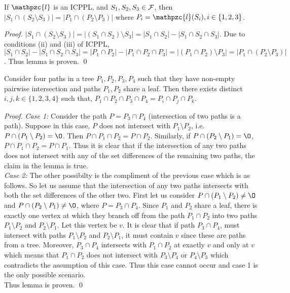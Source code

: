 \documentclass{llncs}
\def\cF{{\cal F}}
\def\cl{\mathpzc{l}}
\begin{document}
\begin{lemma}
  \label{lem:setminuscard}
  If $\cl$ is an ICPPL, and $S_1, S_2, S_3 \in
  \cF$, then $|S_1 \cap (S_2 \setminus S_3)| = |P_1 \cap (P_2
   \setminus P_3)|$ where $P_i = \cl(S_i), i \in \{1, 2, 3\}$.
\end{lemma}
\begin{proof}
  $|S_1 \cap (S_2 \setminus S_3)| = |(S_1 \cap S_2) \setminus S_3| =
  |S_1 \cap S_2| - |S_1 \cap S_2 \cap S_3|$. Due to conditions (ii)
  and (iii) of ICPPL, $|S_1 \cap S_2| - |S_1 \cap S_2 \cap S_3| = |P_1
  \cap P_2| - |P_1 \cap P_2 \cap P_3| = |(P_1 \cap P_2) \setminus P_3|
  = |P_1 \cap (P_2 \setminus P_3)|$. Thus lemma is proven. \qed
\end{proof}

\begin{lemma}
  \label{lem:fourpaths} Consider four paths in a tree $P_1, P_2, P_3,
  P_4$ such that they have non-empty pairwise intersection and paths $P_1,
  P_2$ share a leaf. Then there exists distinct $i, j, k \in
  \{1,2,3,4\}$ such that, $P_1 \cap P_2 \cap P_3 \cap P_4 = P_i \cap
  P_j \cap P_k$.
\end{lemma}
\begin{proof}
  {\em Case 1:} Consider the path $P = P_3 \cap P_4$ (intersection of two paths is a path).
  Suppose in this case, $P$ does not intersect with $P_1 \setminus
  P_2$, i.e. $P \cap (P_1 \setminus P_2) = \O$. Then $P \cap P_1 \cap
  P_2 = P \cap P_2$. Similarly, if $P \cap (P_2 \setminus P_1) = \O$,
  $P \cap P_1 \cap P_2 = P \cap P_1$. Thus it is clear that if the
  intersection of any two paths does not intersect with any of the set
  differences of
  the remaining two paths, the claim in the lemma is true.\\
  {\em Case 2:} The other possibilty is the compliment of the previous
  case which is as follows. So let us assume that the intersection of
  any two paths intersects with both the set differences of the other
  two. First let us consider $P \cap (P_1 \setminus P_2) \ne \O$ and
  $P \cap (P_2 \setminus P_1) \ne \O$, where $P = P_3 \cap P_4$. Since
  $P_1$ and $P_2$ share a leaf, there is exactly one vertex at which
  they branch off from the path $P_1 \cap P_2$ into two paths $P_1
  \setminus P_2$ and $P_2 \setminus P_1$. Let this vertex be $v$. It
  is clear that if path $P_3 \cap P_4$, must intersect with paths $P_1
  \setminus P_2$ and $P_2 \setminus P_1$, it must contain $v$ since
  these are paths from a tree. Moreover, $P_3 \cap P_4$ intersects
  with $P_1 \cap P_2$ at exactly $v$ and only at $v$ which means that
  $P_1 \cap P_2$ does not intersect with $P_3 \setminus P_4$ or $P_4
  \setminus P_3$ which contradicts the assumption of this case. Thus
  this  case cannot occur and case 1 is the only possible scenario. \\
  Thus lemma is proven. \qed
\end{proof}
\end{document}
